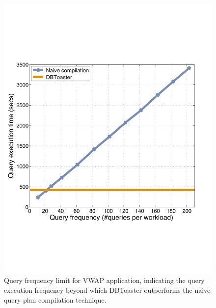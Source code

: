 \begin{figure}
\begin{center}
\includegraphics[scale=0.25]{../plots/vwap_query_freq_dn}
\end{center}
\caption{Query frequency limit for VWAP application, indicating the
query execution frequency beyond which DBToaster outperforms the naive query
plan compilation technique.}
\label{fig:vwap_query_freq}
\end{figure}

